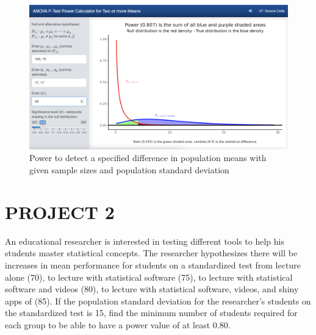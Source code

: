 \documentclass[
]{article}
\begin{document}
\begin{figure}

{\centering \includegraphics[width=5.93in]{fig-power3a} 

}

\caption{Power to detect a specified difference in population means with given sample sizes and population standard deviation}\label{fig:power3}
\end{figure}

\hypertarget{project-2}{%
\section*{PROJECT 2}\label{project-2}}

An educational researcher is interested in testing different tools to help his students master statistical concepts. The researcher hypothesizes there will be increases in mean performance for students on a standardized test from lecture alone (70), to lecture with statistical software (75), to lecture with statistical software and videos (80), to lecture with statistical software, videos, and shiny apps of (85). If the population standard deviation for the researcher's students on the standardized test is 15, find the minimum number of students required for each group to be able to have a power value of at least 0.80.
\end{document}
